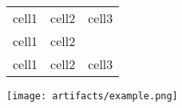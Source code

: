 \documentclass{article}
\begin{document}
\begin{center}
\begin{tabular}{|c|c|c|} 
\hline
cell1 & cell2 & cell3 \\
cell1 & cell2 &  \\
cell1 & cell2 & cell3 \\
\hline
\end{tabular}
\end{center}
\begin{center}
\texttt{[image: artifacts/example.png]}
\end{center}
\end{document}
